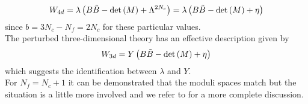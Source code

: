 \begin{equation}
  W_{4d} = \lambda \left( B \tilde{B} - \mathrm{det } \,{(M)} + \Lambda^{2 N_c} \right) = \lambda \left( B \tilde{B} - \mathrm{det } \,{(M)} + \eta \right) 
  \end{equation}  
since $b = 3 N_c - N_f = 2 N_c$ for these particular values.\\
The perturbed three-dimensional theory has an effective description given by
\begin{equation}
	W_{3d} = Y \left( B \tilde{B} - \mathrm{det } \,{(M)} + \eta \right)
\end{equation}
which suggests the identification between $\lambda$ and $Y$.\\
For $N_f = N_c + 1$ it can be demonstrated that the moduli spaces match but the situation is a little more involved and we refer to \cite{Aharony:2013dha} for a more complete discussion.\\ 

